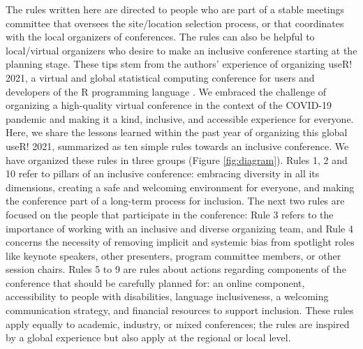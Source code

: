\documentclass[10pt,letterpaper]{article}
\begin{document}
The rules written here are directed to people who are part of a stable meetings committee that oversees the site/location selection process, or that coordinates with the local organizers of conferences.
The rules can also be helpful to local/virtual organizers who desire to make an inclusive conference starting at the planning stage.
These tips stem from the authors' experience of organizing useR! 2021, a virtual and global statistical computing conference for users and developers of the R programming language \cite{r_core_team_2021}. 
We embraced the challenge of organizing a high-quality virtual conference in the context of the COVID-19 pandemic and making it a kind, inclusive, and accessible experience for everyone. 
Here, we share the lessons learned within the past year of organizing this global useR! 2021, summarized as ten simple rules towards an inclusive conference.
We have organized these rules in three groups (Figure \ref{fig:diagram}).
Rules 1, 2 and 10 refer to pillars of an inclusive conference: embracing diversity in all its dimensions, creating a safe and welcoming environment for everyone, and making the conference part of a long-term process for inclusion.
The next two rules are focused on the people that participate in the conference: 
Rule 3 refers to the importance of working with an inclusive and diverse organizing team, and Rule 4 concerns the necessity of removing implicit and systemic bias from spotlight roles like keynote speakers, other presenters, program committee members, or other session chairs. 
Rules 5 to 9 are rules about actions regarding components of the conference that should be carefully planned for: an online component, accessibility to people with disabilities, language inclusiveness, a welcoming communication strategy, and financial resources to support inclusion. 
These rules apply equally to academic, industry, or mixed conferences; the rules are inspired by a global experience but also apply at the regional or local level.
\end{document}
